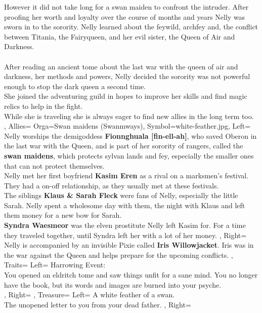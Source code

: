 \documentclass[10pt,a4paper]{scrbook}
\begin{document}
{{			However it did not take long for a swan maiden to confront the intruder.
			After proofing her worth and loyalty over the course of months and years Nelly was sworn in to the sorority.
			Nelly learned about the feywild, archfey and, the conflict between Titania, the Fairyqueen, and her evil sister, the Queen of Air and Darkness.\\
			\\
			After reading an ancient tome about the last war with the queen of air and darkness, her methods and powers, Nelly decided the sorority was not powerful enough to stop the dark queen a second time.\\
			She joined the adventuring guild in hopes to improve her skills and find magic relics to help in the fight.\\
			While she is traveling she is always eager to find new allies in the long term too.\\
		},
		Allies={
			Orga=Swan maidens (Swanmways),
			Symbol=white-feather.jpg,
			Left={
				Nelly worships the demigoddess \textbf{Fionnghuala [fin-ell-ah]}, who saved Oberon in the last war with the Queen, and is part of her sorority of rangers, called the \textbf{swan maidens}, which protects sylvan lands and fey, especially the smaller ones that can not protect themselves.\\
				Nelly met her first boyfriend \textbf{Kasim Eren} as a rival on a marksmen's festival. They had a on-off relationship, as they usually met at these festivals.\\
				The siblings \textbf{Klaus \& Sarah Fleck} were fans of Nelly, especially the little Sarah. Nelly spent a wholesome day with them, the night with Klaus and left them money for a new bow for Sarah.\\
				\textbf{Syndra Waesmeor} was the elven prostitute Nelly left Kasim for. For a time they traveled together, until Syndra left her with a lot of her money.
			},
			Right={
				Nelly is accompanied by an invisible Pixie called \textbf{Iris Willowjacket}.
				Iris was in the war against the Queen and helps prepare for the upcoming conflicts.
			}
		},
		Traits={
			Left={
				Harrowing Event:\\
				You opened an eldritch tome and saw things unfit for a sane mind. You no longer have the book, but its words and images are burned into your psyche.\\
			},
			Right={
			}
		},
		Treasure={
			Left={
				A white feather of a swan.\\
				The unopened letter to you from your dead father.
			},
			Right={
			}
		}
	}
\end{document}
